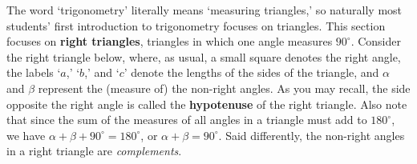 \documentclass{ximera}
\begin{document}
	\author{Stitz-Zeager}




\setcounter{footnote}{0}

\label{AppRightTrig}

The word `trigonometry' literally means `measuring triangles,'  so naturally most students' first introduction to trigonometry focuses on triangles.   This section focuses on   \textbf{right triangles}, triangles in which one angle measures $90^{\circ}$.  Consider the right triangle below, where, as usual, a small square denotes the  right angle, the  labels `$a$,' `$b$,' and `$c$'  denote the lengths of the sides of the triangle, and $\alpha$ and $\beta$ represent the (measure of) the non-right angles.  As you may recall, the side opposite the right angle is called the   \textbf{hypotenuse} of the right triangle.  Also note that since the sum of the measures of all angles in a triangle must add to $180^{\circ}$, we have $\alpha + \beta + 90^{\circ}= 180^{\circ}$, or $\alpha + \beta = 90^{\circ}$.  Said differently, the non-right angles in a right triangle are \textit{complements}.


\begin{image}
\end{image}
\end{document}
